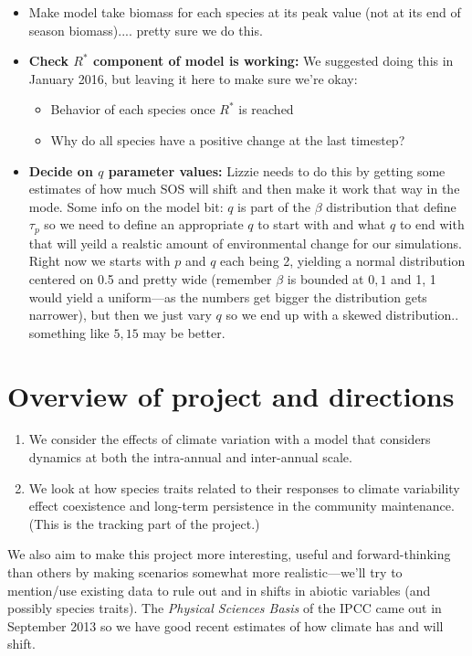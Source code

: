 \documentclass[11pt,a4paper,oneside]{article}
\begin{document}
\begin{itemize}
\item Make model take biomass for each species at its peak value (not at its end of season biomass).... pretty sure we do this.
\item {\bf Check $R^{*}$ component of model is working:} We suggested doing this in January 2016, but leaving it here to make sure we're okay:
\begin{itemize}
\item Behavior of each species once $R^{*}$ is reached
\item Why do all species have a positive change at the last timestep?
\end{itemize}
\item {\bf Decide on $q$ parameter values:}
Lizzie needs to do this by getting some estimates of how much SOS will shift and then make it work that way in the mode. Some info on the model bit: $q$ is part of the $\beta$ distribution that define $\tau_{p}$ so we need to define an appropriate $q$ to start with and what $q$ to end with that will yeild a realstic amount of environmental change for our simulations. Right now we starts with $p$ and $q$ each being 2, yielding a normal distribution centered on 0.5 and pretty wide (remember $\beta$ is bounded at $0,1$ and 1, 1 would yield a uniform---as the numbers get bigger the distribution gets narrower), but then we just vary $q$ so we end up with a skewed distribution.. something like $5,15$ may be better.
\end{itemize}

\newpage
\section{Overview of project and directions}
\noindent 
\begin{enumerate}
\item We consider the effects of climate variation with a model that considers dynamics at both the
intra-annual and inter-annual scale. %
\item We look at how species traits related to their responses to
  climate variability effect coexistence and long-term persistence in the community
  maintenance. (This is the tracking part of the project.) 
\end{enumerate}

\noindent We also aim to make  this project more
interesting, useful and forward-thinking than others by making
scenarios somewhat more realistic---we'll try to mention/use
existing data to rule out and in shifts in abiotic variables (and
possibly species traits). The \emph{Physical Sciences Basis} of the IPCC came out in September 2013 so we have good recent estimates of how climate has and will shift.\\
\end{document}
